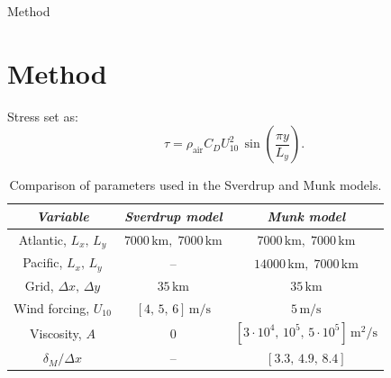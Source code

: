 \begin{frame}{Method}
  \section{Method}

  Stress set as: 
  \begin{equation}
    \tau=\rho_\text{air}C_DU_{10}^2\,\sin\left(\frac{\pi y}{L_y}\right).
  \end{equation}

\begin{table}[H]
\centering
\begin{tabular}{|c|c|c|}
\hline
\textit{Variable} & \textit{Sverdrup model} & \textit{Munk model} \\
\hline
Atlantic, $L_x, \, L_y$ 
& $7000\,\text{km},\; 7000\,\text{km}$ 
& $7000\,\text{km},\; 7000\,\text{km}$ \\
\hline
Pacific, $L_x, \, L_y$
& -- 
& $14000\,\text{km},\;7000\,\text{km}$ \\
\hline
Grid, $\Delta x, \, \Delta y$
& $ 35\,\text{km}$ 
& $ 35\,\text{km}$ \\
\hline
Wind forcing, $U_{10}$
& $[4,\,5,\,6]\,\text{m/s}$ 
& $5\,\text{m/s}$ \\
\hline
Viscosity, $A$ 
& $0$ 
& $[3\cdot10^4,\,10^5,\,5\cdot10^5]\,\text{m}^2/\text{s}$ \\
\hline
$\delta_M/\Delta x $
& -- 
& $[3.3,\,4.9,\,8.4]$ \\
\hline
\end{tabular}
\caption{Comparison of parameters used in the Sverdrup and Munk models.}
\label{tab:model_params}
\end{table}

\end{frame}


